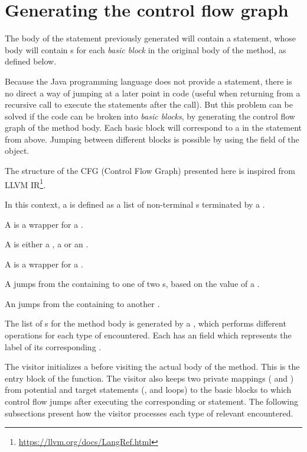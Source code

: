 \section{Generating the control flow graph}

The body of the  statement previously generated will contain a  statement, whose body will
contain s for each \textit{basic block} in the original body of the method, as defined below.

Because the Java programming language does not provide a  statement, there is no direct a way of jumping at
a later point in code (useful when returning from a recursive call to execute the statements after the call). But this
problem can be solved if the code can be broken into \textit{basic blocks}, by generating the control flow graph of the
method body. Each basic block will correspond to a  in the  statement from above. Jumping
between different blocks is possible by using the  field of the  object.

The structure of the CFG (Control Flow Graph)  presented here is inspired from LLVM
IR\footnote{\url{https://llvm.org/docs/LangRef.html}}.

In this context, a  is defined as a list of non-terminal s terminated by a
.

A  is a wrapper for a .

A  is either a , a  or an
.

A  is a wrapper for a .

A  jumps from the containing  to one of two s, based on the
value of a .

An  jumps from the containing  to another .

The list of s for the method body is generated by a , which performs
different operations for each type of  encountered. Each  has an  field which
represents the label of its corresponding .

The visitor initializes a  before visiting the actual body of the method. This is the entry block of
the function. The visitor also keeps two private mappings ( and ) from
potential  and  target statements (,  and  loops) to
the basic blocks to which control flow jumps after executing the corresponding  or  statement.
The following subsections present how the visitor processes each type of relevant  encountered.

